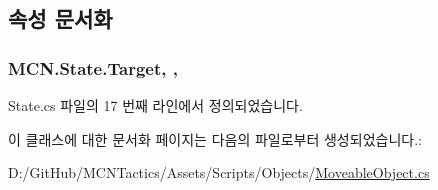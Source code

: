 \subsection{속성 문서화}
\subsubsection[{\texorpdfstring{Target}{Target}}]{ M\+C\+N.\+State.\+Target\hspace{0.3cm}{\ttfamily [get]}, {\ttfamily [protected]}, {\ttfamily [inherited]}}\hypertarget{class_m_c_n_1_1_state_a79a563b32f183c9adc9a96679fc57eb8}{}\label{class_m_c_n_1_1_state_a79a563b32f183c9adc9a96679fc57eb8}


State.\+cs 파일의 17 번째 라인에서 정의되었습니다.



이 클래스에 대한 문서화 페이지는 다음의 파일로부터 생성되었습니다.\+:\begin{DoxyCompactItemize}
\item 
D\+:/\+Git\+Hub/\+M\+C\+N\+Tactics/\+Assets/\+Scripts/\+Objects/\hyperlink{_moveable_object_8cs}{Moveable\+Object.\+cs}\end{DoxyCompactItemize}
